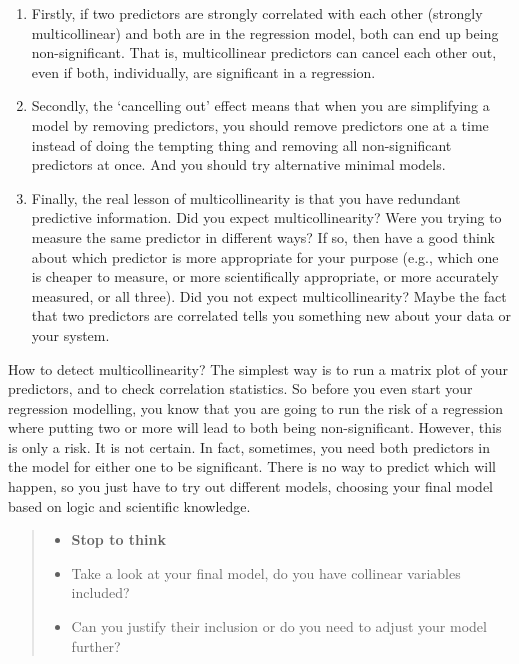 \documentclass[
]{book}
\providecommand{\tightlist}{%
  \setlength{\itemsep}{0pt}\setlength{\parskip}{0pt}}
\begin{document}
\begin{enumerate}
\def\labelenumi{\arabic{enumi})}
\tightlist
\item
  Firstly, if two predictors are strongly correlated with each other (strongly multicollinear) and both are in the regression model, both can end up being non-significant. That is, multicollinear predictors can cancel each other out, even if both, individually, are significant in a regression.\\
\item
  Secondly, the `cancelling out' effect means that when you are simplifying a model by removing predictors, you should remove predictors one at a time instead of doing the tempting thing and removing all non-significant predictors at once. And you should try alternative minimal models.\\
\item
  Finally, the real lesson of multicollinearity is that you have redundant predictive information. Did you expect multicollinearity? Were you trying to measure the same predictor in different ways? If so, then have a good think about which predictor is more appropriate for your purpose (e.g., which one is cheaper to measure, or more scientifically appropriate, or more accurately measured, or all three). Did you not expect multicollinearity? Maybe the fact that two predictors are correlated tells you something new about your data or your system.
\end{enumerate}

How to detect multicollinearity? The simplest way is to run a matrix plot of your predictors, and to check correlation statistics. So before you even start your regression modelling, you know that you are going to run the risk of a regression where putting two or more will lead to both being non-significant. However, this is only a risk. It is not certain. In fact, sometimes, you need both predictors in the model for either one to be significant. There is no way to predict which will happen, so you just have to try out different models, choosing your final model based on logic and scientific knowledge.

\begin{quote}
\begin{itemize}
\tightlist
\item
  \textbf{Stop to think}
\item
  Take a look at your final model, do you have collinear variables included?
\item
  Can you justify their inclusion or do you need to adjust your model further?
\end{itemize}
\end{quote}
\end{document}
